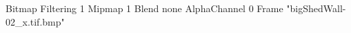 {Bitmap
	{Filtering 1}
	{Mipmap 1}
	{Blend none}
	{AlphaChannel 0}
	{Frame "bigShedWall-02_x.tif.bmp"}
}
